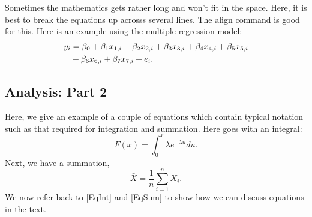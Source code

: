 \documentclass[conference]{IEEEtran}
\begin{document}
Sometimes the mathematics gets rather long and won't fit in the space. Here, it is best to break the equations up acrosss several lines. The align command is good for this. Here is an example using the multiple regression model:
\begin{align}
y_i&=\beta_0+\beta_1 x_{1,i}+\beta_2 x_{2,i}+\beta_3 x_{3,i}+\beta_4 x_{4,i}+\beta_5 x_{5,i}\notag\\
&+\beta_6 x_{6,i}+\beta_7 x_{7,i} + e_i.
\end{align}
\subsection{Analysis: Part 2}\label{analysis2}
Here, we give an example of a couple of equations which contain typical notation such as that required for integration and summation. Here goes with an integral:
\begin{equation}\label{EqInt}
F(x)=\int_0^x \lambda e^{-\lambda u} du.
\end{equation}
Next, we have a summation,
\begin{equation}\label{EqSum}
\bar{X}=\frac{1}{n} \sum_{i=1}^n X_i.
\end{equation}	
We now refer back to \eqref{EqInt} and \eqref{EqSum} to show how we can discuss equations in the text.
\end{document}
